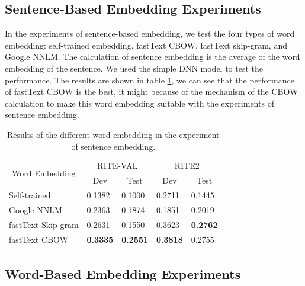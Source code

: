 \documentclass[12pt]{article}
\begin{document}
\begin{CJK*}{UTF8}{bkai}
\begin{spacing}{1.77}
\subsection{Sentence-Based Embedding Experiments}
In the experiments of sentence-based embedding, we test the four types of word embedding: self-trained embedding, fastText CBOW, fastText skip-gram, and Google NNLM. The calculation of sentence embedding is the average of the word embedding of the sentence. We used the simple DNN model to test the performance. The results are shown in table \ref{result:sent_emb_nnlm}, we can see that the performance of fastText CBOW is the best, it might because of the mechanism of the CBOW calculation to make this word embedding suitable with the experiments of sentence embedding.

\begin{table}[H]
  \centering
  \setlength{\extrarowheight}{-3pt}
  \caption{Results of the different word embedding in the experiment of sentence embedding.}
  \label{result:sent_emb_nnlm}
  \begin{tabular}{|l|l|l|l|l|}
  \hline
  \multicolumn{1}{|c|}{\multirow{2}{*}{Word   Embedding}} & \multicolumn{2}{c|}{RITE-VAL} & \multicolumn{2}{c|}{RITE2} \\ \cline{2-5}
  \multicolumn{1}{|c|}{} & \multicolumn{1}{c|}{Dev} & \multicolumn{1}{c|}{Test} & \multicolumn{1}{c|}{Dev} & \multicolumn{1}{c|}{Test} \\ \hline
  Self-trained & 0.1382 & 0.1000 & 0.2711 & 0.1445 \\ \hline
  Google NNLM & 0.2363 & 0.1874 & 0.1851 & 0.2019 \\ \hline
  fastText Skip-gram & 0.2631 & 0.1550 & 0.3623 & \textbf{0.2762} \\ \hline
  fastText CBOW & \textbf{0.3335} & \textbf{0.2551} & \textbf{0.3818} & 0.2755 \\ \hline
  \end{tabular}
\end{table}

\subsection{Word-Based Embedding Experiments}

\end{spacing}
\end{CJK*}
\end{document}
